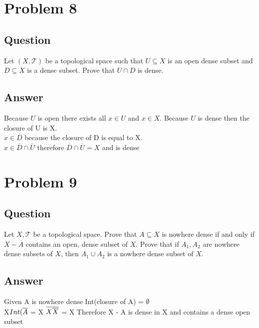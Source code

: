 \documentclass{article}
\begin{document}
\section*{Problem 8}
\subsection*{Question}
Let \((X,\mathscr{T} )\) be a topological space such that \(U \subseteq X\) is an open dense subset and \(D \subseteq X\) is a dense subset. Prove that \(U \cap D\) is dense.
\subsection*{Answer}
Because \(U\) is open there exists all \(x \in U\) and \(x \in X\). Because \(U\) is dense then the closure of U is X.
\\\(x \in \overline{D}\) because the closure of D is equal to X.
\\\(x \in \overline{D} \cap \overline{U}\) therefore \(\overline{D} \cap \overline{U} = X\) and is dense
\section*{Problem 9}
\subsection*{Question}
Let \(X, \mathscr{T}\) be a topological space. Prove that \(A \subseteq X\) is nowhere dense if and only if \(X - \overline{A}\) contains an open, dense subset of \(X\). Prove that if \(A_{1},A_{2}\) are nowhere dense subsets of \(X\), then \(A_{1} \cup A_{2}\) is a nowhere dense subset of \(X\).
\subsection*{Answer}
Given A is nowhere dense Int(closure of A) = \(\emptyset\)
\\X\(\\Int(\overline{A}\) = X
\(\overline{X\\\overline{X}}\) = X
Therefore X - A is dense in X and contains a dense open subset
\end{document}
